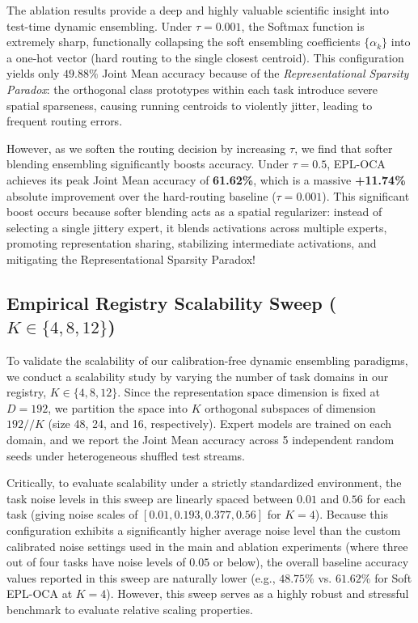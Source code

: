 The ablation results provide a deep and highly valuable scientific insight into test-time dynamic ensembling. Under $\tau = 0.001$, the Softmax function is extremely sharp, functionally collapsing the soft ensembling coefficients $\{\alpha_k\}$ into a one-hot vector (hard routing to the single closest centroid). This configuration yields only $49.88\%$ Joint Mean accuracy because of the \emph{Representational Sparsity Paradox}: the orthogonal class prototypes within each task introduce severe spatial sparseness, causing running centroids to violently jitter, leading to frequent routing errors.

However, as we soften the routing decision by increasing $\tau$, we find that softer blending ensembling significantly boosts accuracy. Under $\tau = 0.5$, EPL-OCA achieves its peak Joint Mean accuracy of \textbf{61.62\%}, which is a massive \textbf{+11.74\%} absolute improvement over the hard-routing baseline ($\tau = 0.001$). This significant boost occurs because softer blending acts as a spatial regularizer: instead of selecting a single jittery expert, it blends activations across multiple experts, promoting representation sharing, stabilizing intermediate activations, and mitigating the Representational Sparsity Paradox!

\subsection{Empirical Registry Scalability Sweep ($K \in \{4, 8, 12\}$)}
To validate the scalability of our calibration-free dynamic ensembling paradigms, we conduct a scalability study by varying the number of task domains in our registry, $K \in \{4, 8, 12\}$. Since the representation space dimension is fixed at $D=192$, we partition the space into $K$ orthogonal subspaces of dimension $192 // K$ (size 48, 24, and 16, respectively). Expert models are trained on each domain, and we report the Joint Mean accuracy across 5 independent random seeds under heterogeneous shuffled test streams.

Critically, to evaluate scalability under a strictly standardized environment, the task noise levels in this sweep are linearly spaced between $0.01$ and $0.56$ for each task (giving noise scales of $[0.01, 0.193, 0.377, 0.56]$ for $K=4$). Because this configuration exhibits a significantly higher average noise level than the custom calibrated noise settings used in the main and ablation experiments (where three out of four tasks have noise levels of $0.05$ or below), the overall baseline accuracy values reported in this sweep are naturally lower (e.g., $48.75\%$ vs. $61.62\%$ for Soft EPL-OCA at $K=4$). However, this sweep serves as a highly robust and stressful benchmark to evaluate relative scaling properties.

